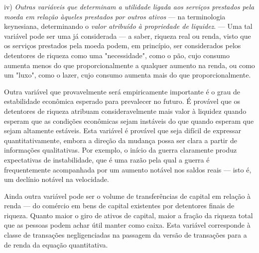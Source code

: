 \documentclass[12pt]{article}
\begin{document}
iv) \textit{Outras variáveis que determinam a utilidade ligada aos serviços prestados pela moeda em relação àqueles prestados por outros ativos} — na terminologia keynesiana, determinando o \textit{valor atribuído à propriedade de liquidez}. — Uma tal variável pode ser uma já considerada — a saber, riqueza real ou renda, visto que os serviços prestados pela moeda podem, em princípio, ser considerados pelos detentores de riqueza como uma "necessidade", como o pão, cujo consumo aumenta menos do que proporcionalmente a qualquer aumento na renda, ou como um "luxo", como o lazer, cujo consumo aumenta mais do que proporcionalmente.

Outra variável que provavelmente será empiricamente importante é o grau de estabilidade econômica esperado para prevalecer no futuro. É provável que os detentores de riqueza atribuam consideravelmente mais valor à liquidez quando esperam que as condições econômicas sejam instáveis do que quando esperam que sejam altamente estáveis. Esta variável é provável que seja difícil de expressar quantitativamente, embora a direção da mudança possa ser clara a partir de informações qualitativas. Por exemplo, o início da guerra claramente produz expectativas de instabilidade, que é uma razão pela qual a guerra é frequentemente acompanhada por um aumento notável nos saldos reais — isto é, um declínio notável na velocidade.

Ainda outra variável pode ser o volume de transferências de capital em relação à renda — do comércio em bens de capital existentes por detentores finais de riqueza. Quanto maior o giro de ativos de capital, maior a fração da riqueza total que as pessoas podem achar útil manter como caixa. Esta variável corresponde à classe de transações negligenciadas na passagem da versão de transações para a de renda da equação quantitativa.
\end{document}
